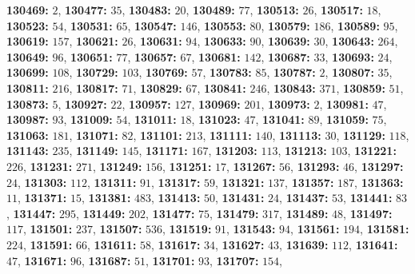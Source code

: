 \textsf{\bfseries 130469:} $2$, \textsf{\bfseries 130477:} $35$, \textsf{\bfseries 130483:} $20$, \textsf{\bfseries 130489:} $77$, \textsf{\bfseries 130513:} $26$, \textsf{\bfseries 130517:} $18$, \textsf{\bfseries 130523:} $54$, \textsf{\bfseries 130531:} $65$, \textsf{\bfseries 130547:} $146$, \textsf{\bfseries 130553:} $80$, \textsf{\bfseries 130579:} $186$, \textsf{\bfseries 130589:} $95$, \textsf{\bfseries 130619:} $157$, \textsf{\bfseries 130621:} $26$, \textsf{\bfseries 130631:} $94$, \textsf{\bfseries 130633:} $90$, \textsf{\bfseries 130639:} $30$, \textsf{\bfseries 130643:} $264$, \textsf{\bfseries 130649:} $96$, \textsf{\bfseries 130651:} $77$, \textsf{\bfseries 130657:} $67$, \textsf{\bfseries 130681:} $142$, \textsf{\bfseries 130687:} $33$, \textsf{\bfseries 130693:} $24$, \textsf{\bfseries 130699:} $108$, \textsf{\bfseries 130729:} $103$, \textsf{\bfseries 130769:} $57$, \textsf{\bfseries 130783:} $85$, \textsf{\bfseries 130787:} $2$, \textsf{\bfseries 130807:} $35$, \textsf{\bfseries 130811:} $216$, \textsf{\bfseries 130817:} $71$, \textsf{\bfseries 130829:} $67$, \textsf{\bfseries 130841:} $246$, \textsf{\bfseries 130843:} $371$, \textsf{\bfseries 130859:} $51$, \textsf{\bfseries 130873:} $5$, \textsf{\bfseries 130927:} $22$, \textsf{\bfseries 130957:} $127$, \textsf{\bfseries 130969:} $201$, \textsf{\bfseries 130973:} $2$, \textsf{\bfseries 130981:} $47$, \textsf{\bfseries 130987:} $93$, \textsf{\bfseries 131009:} $54$, \textsf{\bfseries 131011:} $18$, \textsf{\bfseries 131023:} $47$, \textsf{\bfseries 131041:} $89$, \textsf{\bfseries 131059:} $75$, \textsf{\bfseries 131063:} $181$, \textsf{\bfseries 131071:} $82$, \textsf{\bfseries 131101:} $213$, \textsf{\bfseries 131111:} $140$, \textsf{\bfseries 131113:} $30$, \textsf{\bfseries 131129:} $118$, \textsf{\bfseries 131143:} $235$, \textsf{\bfseries 131149:} $145$, \textsf{\bfseries 131171:} $167$, \textsf{\bfseries 131203:} $113$, \textsf{\bfseries 131213:} $103$, \textsf{\bfseries 131221:} $226$, \textsf{\bfseries 131231:} $271$, \textsf{\bfseries 131249:} $156$, \textsf{\bfseries 131251:} $17$, \textsf{\bfseries 131267:} $56$, \textsf{\bfseries 131293:} $46$, \textsf{\bfseries 131297:} $24$, \textsf{\bfseries 131303:} $112$, \textsf{\bfseries 131311:} $91$, \textsf{\bfseries 131317:} $59$, \textsf{\bfseries 131321:} $137$, \textsf{\bfseries 131357:} $187$, \textsf{\bfseries 131363:} $11$, \textsf{\bfseries 131371:} $15$, \textsf{\bfseries 131381:} $483$, \textsf{\bfseries 131413:} $50$, \textsf{\bfseries 131431:} $24$, \textsf{\bfseries 131437:} $53$, \textsf{\bfseries 131441:} $83$, \textsf{\bfseries 131447:} $295$, \textsf{\bfseries 131449:} $202$, \textsf{\bfseries 131477:} $75$, \textsf{\bfseries 131479:} $317$, \textsf{\bfseries 131489:} $48$, \textsf{\bfseries 131497:} $117$, \textsf{\bfseries 131501:} $237$, \textsf{\bfseries 131507:} $536$, \textsf{\bfseries 131519:} $91$, \textsf{\bfseries 131543:} $94$, \textsf{\bfseries 131561:} $194$, \textsf{\bfseries 131581:} $224$, \textsf{\bfseries 131591:} $66$, \textsf{\bfseries 131611:} $58$, \textsf{\bfseries 131617:} $34$, \textsf{\bfseries 131627:} $43$, \textsf{\bfseries 131639:} $112$, \textsf{\bfseries 131641:} $47$, \textsf{\bfseries 131671:} $96$, \textsf{\bfseries 131687:} $51$, \textsf{\bfseries 131701:} $93$, \textsf{\bfseries 131707:} $154$, 
